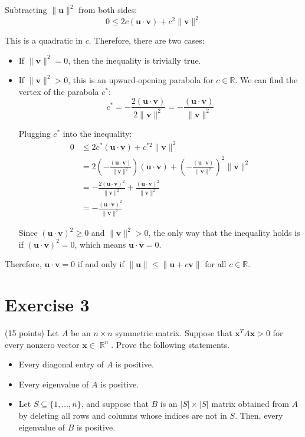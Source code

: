 \documentclass{article}
\DeclareMathOperator{\R}{\mathbb R}
\begin{document}
Subtracting $\|\mathbf{u}\|^2$ from both sides:
\[0 \leq 2c(\mathbf{u} \cdot \mathbf{v}) + c^2\|\mathbf{v}\|^2\]

This is a quadratic in $c$. Therefore, there are two cases:
\begin{itemize}
    \item If $\|\mathbf{v}\|^2 = 0$, then the inequality is trivially true.
    \item If $\|\mathbf{v}\|^2 > 0$, this is an upward-opening parabola for $c \in \mathbb{R}$. We can find the vertex of the parabola $c^*$:
    $$
    c^* = -\frac{2(\mathbf{u} \cdot \mathbf{v})}{2\|\mathbf{v}\|^2} = -\frac{(\mathbf{u} \cdot \mathbf{v})}{\|\mathbf{v}\|^2}
    $$

    Plugging $c^*$ into the inequality:
    \begin{align*}
        0 &\leq 2c^*(\mathbf{u} \cdot \mathbf{v}) + c^{*2}\|\mathbf{v}\|^2 \\
        &= 2\left(-\frac{(\mathbf{u} \cdot \mathbf{v})}{\|\mathbf{v}\|^2}\right)(\mathbf{u} \cdot \mathbf{v}) + \left(-\frac{(\mathbf{u} \cdot \mathbf{v})}{\|\mathbf{v}\|^2}\right)^2\|\mathbf{v}\|^2 \\
        &= -\frac{2(\mathbf{u} \cdot \mathbf{v})^2}{\|\mathbf{v}\|^2} + \frac{(\mathbf{u} \cdot \mathbf{v})^2}{\|\mathbf{v}\|^2} \\
        &= -\frac{(\mathbf{u} \cdot \mathbf{v})^2}{\|\mathbf{v}\|^2}
    \end{align*}

    Since $(\mathbf{u} \cdot \mathbf{v})^2 \geq 0$ and $\|\mathbf{v}\|^2 > 0$, the only way that the inequality holds is if $(\mathbf{u} \cdot \mathbf{v})^2 = 0$, which means $\mathbf{u} \cdot \mathbf{v} = 0$.
\end{itemize}

Therefore, $\mathbf{u} \cdot \mathbf{v} = 0$ if and only if $\|\mathbf{u}\| \leq \|\mathbf{u} + c\mathbf{v}\|$ for all $c \in \mathbb{R}$.

\newpage

\section*{Exercise 3}
(15 points) Let $A$ be an $n \times n$ symmetric matrix. Suppose that $\mathbf{x}^T A\mathbf{x} > 0$ for every nonzero vector $\mathbf{x} \in \R^n$. Prove the following statements.
\begin{itemize}
    \item Every diagonal entry of $A$ is positive.
    \item Every eigenvalue of $A$ is positive.
    \item Let $S \subseteq \{1,\ldots,n\}$, and suppose that $B$ is an $|S| \times |S|$ matrix obtained from $A$ by deleting all rows and columns whose indices are not in $S$. Then, every eigenvalue of $B$ is positive.
\end{itemize}
\end{document}
